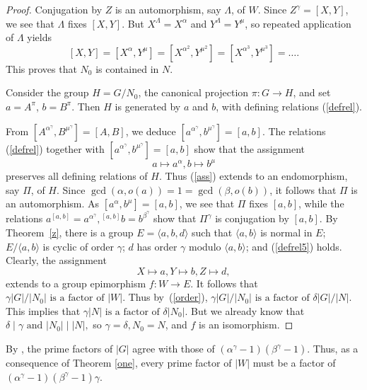 \documentclass{amsart}
\theoremstyle{definition}
\theoremstyle{remark}
\begin{document}
\begin{proof} Conjugation by $Z$ is an automorphism, say $\Lambda$, of $W$. Since $Z^\gamma=[X,Y]$,
we see that $\Lambda$ fixes $[X,Y]$. But $X^\Lambda=X^\alpha$ and $Y^\Lambda=Y^\mu$, so repeated application of $\Lambda$ yields
$$
[X,Y]=[X^\alpha,Y^\mu]=[X^{\alpha^2},Y^{\mu^2}]=[X^{\alpha^3},Y^{\mu^3}]=\dots.
$$
This proves that $N_0$ is contained in $N$.

Consider the group $H=G/N_0$, the canonical projection $\pi:G\to H$, and set $a=A^\pi$, $b=B^\pi$. Then $H$
is generated by $a$ and $b$, with defining relations (\ref{defrel}).

From $[A^{\alpha^\gamma},B^{\mu^\gamma}]=[A,B]$, we deduce
$[a^{\alpha^\gamma},b^{\mu^\gamma}]=[a,b]$. The relations (\ref{defrel}) together with 
$[a^{\alpha^\gamma},b^{\mu^\gamma}]=[a,b]$ show that the assignment
\begin{equation}
\label{ass}
a\mapsto a^\alpha, b\mapsto b^\mu
\end{equation}
preserves all defining relations of $H$. Thus (\ref{ass}) 
extends to an endomorphism, say $\Pi$, of $H$. Since $\gcd(\alpha,o(a))=1=\gcd(\beta,o(b))$, it follows that $\Pi$
is an automorphism. As $[a^{\alpha},b^{\mu}]=[a,b]$, we see that $\Pi$ fixes $[a,b]$,
while the relations $a^{[a,b]}=a^{\alpha^\gamma}, 
{}^{[a,b]} b=b^{\beta^\gamma}$ show that $\Pi^\gamma$ is conjugation by $[a,b]$.
By Theorem~\ref{z}, there is a group $E=\langle a,b,d\rangle$ such that $\langle a,b\rangle$ is normal in $E$; $E/\langle a,b\rangle$
is cyclic of order $\gamma$; $d$ has order $\gamma$ modulo 
$\langle a,b\rangle$; and (\ref{defrel5}) holds. Clearly, the assignment
$$
X\mapsto a, Y\mapsto b, Z\mapsto d,
$$
extends to a group epimorphism $f:W\to E$. It follows that 
$
\gamma|G|/|N_0|\text{ is a factor of }|W|.
$
Thus by~(\ref{order}),
$
\gamma |G|/|N_0|\text{ is a factor of }
\delta |G|/|N|.
$
This implies that
$
\gamma |N| \text{ is a factor of }\delta |N_0|.
$
But we already know that 
$
\delta\mid\gamma\text{ and } |N_0|\mid|N|,
$
so
$\gamma=\delta,N_0=N$, and $f$ is an isomorphism.
\end{proof}

By \cite[Section 4]{M}, the prime factors of $|G|$ agree with those of $(\alpha^\gamma-1)(\beta^\gamma-1)$.
Thus, as a consequence of Theorem \ref{one}, every prime factor of $|W|$ must be a factor of $(\alpha^\gamma-1)(\beta^\gamma-1)\gamma$. 



\end{document}

